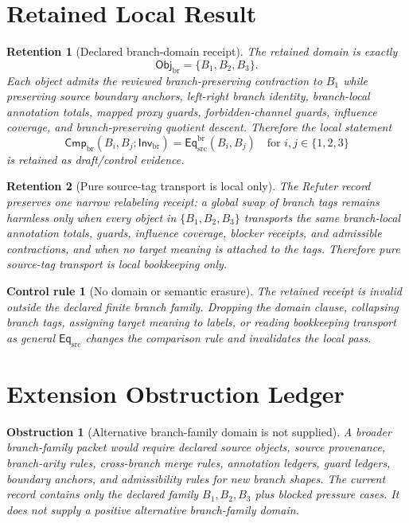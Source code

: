 \documentclass[11pt]{article}
\newcommand{\EqSrc}{\mathsf{Eq}_{\mathrm{src}}}
\newcommand{\EqBr}{\mathsf{Eq}_{\mathrm{src}}^{\mathrm{br}}}
\newcommand{\ObjBr}{\mathsf{Obj}_{\mathrm{br}}}
\newcommand{\InvBr}{\mathsf{Inv}_{\mathrm{br}}}
\newcommand{\CmpBr}{\mathsf{Cmp}_{\mathrm{br}}}
\newtheorem{retention}{Retention}
\newtheorem{obstruction}{Obstruction}
\newtheorem{controlrule}{Control rule}
\begin{document}
\section{Retained Local Result}

\begin{retention}[Declared branch-domain receipt]
The retained domain is exactly
\[
    \ObjBr=\{B_{1},B_{2},B_{3}\}.
\]
Each object admits the reviewed branch-preserving contraction to
\(B_{1}\) while preserving source boundary anchors, left-right branch
identity, branch-local annotation totals, mapped proxy guards,
forbidden-channel guards, influence coverage, and branch-preserving
quotient descent. Therefore the local statement
\[
    \CmpBr(B_i,B_j;\InvBr)=\EqBr(B_i,B_j)
    \quad\text{for }i,j\in\{1,2,3\}
\]
is retained as draft/control evidence.
\end{retention}

\begin{retention}[Pure source-tag transport is local only]
The Refuter record preserves one narrow relabeling receipt: a global swap
of branch tags remains harmless only when every object in
\(\{B_{1},B_{2},B_{3}\}\) transports the same branch-local annotation
totals, guards, influence coverage, blocker receipts, and admissible
contractions, and when no target meaning is attached to the tags.
Therefore pure source-tag transport is local bookkeeping only.
\end{retention}

\begin{controlrule}[No domain or semantic erasure]
The retained receipt is invalid outside the declared finite branch family.
Dropping the domain clause, collapsing branch tags, assigning target
meaning to labels, or reading bookkeeping transport as general
\(\EqSrc\) changes the comparison rule and invalidates the local pass.
\end{controlrule}

\section{Extension Obstruction Ledger}

\begin{obstruction}[Alternative branch-family domain is not supplied]
A broader branch-family packet would require declared source objects,
source provenance, branch-arity rules, cross-branch merge rules,
annotation ledgers, guard ledgers, boundary anchors, and admissibility
rules for new branch shapes. The current record contains only the
declared family \(B_{1},B_{2},B_{3}\) plus blocked pressure cases. It
does not supply a positive alternative branch-family domain.
\end{obstruction}
\end{document}
